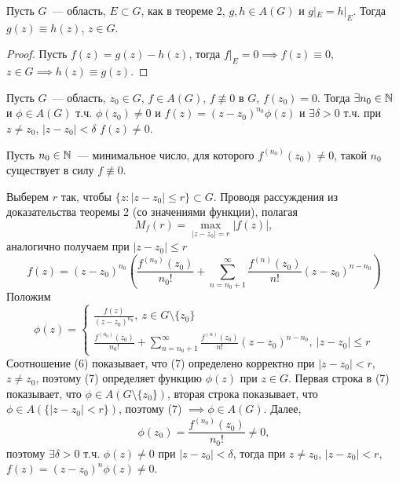 \documentclass[main]{subfiles}
\begin{document}
\begin{corollary}
    Пусть $G$~--- область, $E\subset G$, как в теореме 2, $g, h \in A(G)$ и $g|_{E} = h|_E$.
    Тогда $g(z) \equiv h(z)$, $z \in G$.
\end{corollary}
\begin{proof}
    Пусть $f(z) = g(z) - h(z)$, тогда $f|_E = 0 \implies f(z) \equiv 0$, $z \in G \implies h(z) \equiv g(z)$.
\end{proof}

\begin{corollary}
    Пусть $G$~--- область, $z_0 \in G$, $f \in A(G)$, $f \not \equiv 0$ в $G$, $f(z_0) = 0$.
    Тогда $\exists n_0 \in \mathbb{N}$ и $\phi \in A(G)$ т.ч. $\phi(z_0)\neq 0$ и $f(z) = (z - z_0)^{n_0} \phi(z)$ и $\exists \delta > 0$ т.ч. при $z \neq z_0$, $|z - z_0| < \delta$ $f(z) \neq 0$.
\end{corollary}
\begin{longProof}
    Пусть $n_0 \in \mathbb{N}$~--- минимальное число, для которого $f^{(n_0)}(z_0) \neq 0$, такой $n_0$ существует в силу $f \not\equiv 0$.

    Выберем $r$ так, чтобы $\{ z:|z - z_0| \le r\} \subset G$.
    Проводя рассуждения из доказательства теоремы 2 (со значениями функции), полагая
    \[M_f(r) = \max_{|z-z_0|=r} |f(z)|,\]
    аналогично получаем при $|z-z_0|\le r$
    \[ f(z) = (z - z_0)^{n_0} \left( \frac{f^{(n_0)}(z_0)}{n_0!} + \sum_{n = n_0 + 1}^{\infty} \frac{f^{(n)}(z_0)}{n!} (z - z_0)^{n - n_0} \right) \tag{6} \]
    Положим
    \[\phi(z) =
        \begin{cases}
            \displaystyle
            \frac{f(z)}{(z - z_0)^{n_0}},\ z \in G \setminus \{z_0\} \\
            \displaystyle
            \frac{f^{(n_0)}(z_0)}{n_0!} + \sum_{n = n_0 + 1}^\infty \frac{f^{(n)}(z_0)}{n!} (z - z_0)^{n - n_0},\ |z - z_0|\le r \tag{7}
        \end{cases}
    \]
    Соотношение (6) показывает, что (7) определено корректно при $|z - z_0|<r$, $z \neq z_0$, поэтому (7) определяет функцию $\phi(z)$ при $z\in G$.
    Первая строка в (7) показывает, что $\phi \in A(G \setminus \{z_0\})$, вторая строка показывает, что $\phi \in A(\{|z - z_0| < r\})$, поэтому (7) $\implies \phi \in A(G)$.
    Далее,
    \[\phi(z_0) = \frac{f^{(n_0)}(z_0)}{n_0!} \neq 0,\]
    поэтому $\exists \delta > 0$ т.ч. $\phi(z) \neq 0$ при $|z - z_0| < \delta$, тогда при $z \neq z_0$, $|z - z_0| < r$, $f(z) = (z - z_0)^n \phi(z) \neq 0$.
\end{longProof}
\end{document}
